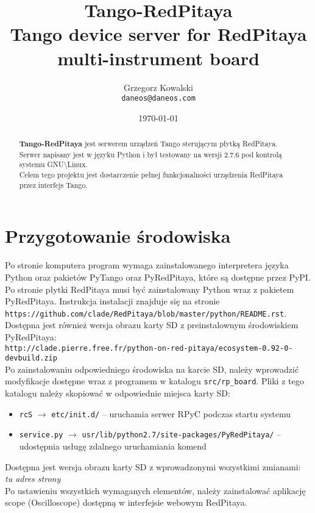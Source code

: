 \documentclass[12pt,a4paper]{article}
\title{Tango-RedPitaya\\\small{Tango device server for RedPitaya multi-instrument board}}
\author{Grzegorz Kowalski\\\texttt{daneos@daneos.com}}
\date{\today}
\begin{document}
	\maketitle
	\vspace{4em}
	
	\begin{abstract}
		\textbf{Tango-RedPitaya} jest serwerem urządzeń Tango sterującym płytką RedPitaya.\\
		Serwer napisany jest w języku Python i był testowany na wersji 2.7.6 pod kontrolą systemu GNU\textbackslash Linux.\\
		Celem tego projektu jest dostarczenie pełnej funkcjonalności urządzenia RedPitaya przez interfejs Tango.
	\end{abstract}

	\newpage
	\section{Przygotowanie środowiska}
	Po stronie komputera program wymaga zainstalowanego interpretera języka Python oraz pakietów PyTango oraz PyRedPitaya, które są dostępne przez PyPI.\\
	Po stronie płytki RedPitaya musi być zainstalowany Python wraz z pakietem PyRedPitaya. Instrukcja instalacji znajduje się na stronie\\
	\texttt{https://github.com/clade/RedPitaya/blob/master/python/README.rst}.\\
	Dostępna jest również wersja obrazu karty SD z preinstalownym środowiskiem PyRedPitaya:\\
	\texttt{http://clade.pierre.free.fr/python-on-red-pitaya/ecosystem-0.92-0-devbuild.zip}\\
	Po zainstalowaniu odpowiedniego środowiska na karcie SD, należy wprowadzić modyfikacje dostępne wraz z programem w katalogu \texttt{src/rp\_board}.
	Pliki z tego katalogu należy skopiować w odpowiednie miejsca karty SD:
	\begin{itemize}
		\item \texttt{rcS} $\to$ \texttt{etc/init.d/} -- uruchamia serwer RPyC podczas startu systemu
		\item \texttt{service.py} $\to$ \texttt{usr/lib/python2.7/site-packages/PyRedPitaya/} -- udostępnia usługę zdalnego uruchamiania komend
	\end{itemize}
	Dostępna jest wersja obrazu karty SD z wprowadzonymi wszystkimi zmianami:\\
	\emph{tu adres strony}\\
	Po ustawieniu wszystkich wymaganych elementów, należy zainstalować aplikację scope (Oscilloscope) dostępną w interfejsie webowym RedPitaya.
\end{document}
